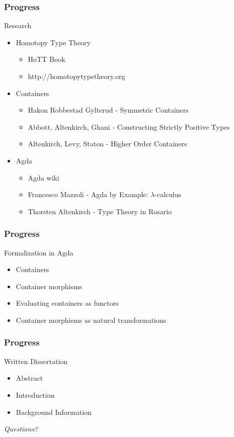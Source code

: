 \documentclass{beamer}
\begin{document}
\begin{frame}
\frametitle{Progress}
\begin{block}{Research}
\begin{itemize}
\item Homotopy Type Theory
\begin{itemize}
\item HoTT Book
\item http://homotopytypetheory.org
\end{itemize}
\item Containers
\begin{itemize}
\item Hakon Robbestad Gylterud - Symmetric Containers
\item Abbott, Altenkirch, Ghani - Constructing Strictly Positive Types
\item Altenkirch, Levy, Staton - Higher Order Containers
\end{itemize}
\item Agda
\begin{itemize}
\item Agda wiki
\item Francesco Mazzoli - Agda by Example: $\lambda$-calculus
\item Thorsten Altenkirch - Type Theory in Rosario
\end{itemize}
\end{itemize}
\end{block}
\end{frame}

\begin{frame}
\frametitle{Progress}

\begin{block}{Formalization in Agda}
\begin{itemize}
\item Containers
\item Container morphisms
\item Evaluating containers as functors
\item Container morphisms as natural transformations
\end{itemize}
\end{block}
\end{frame}

\begin{frame}
\frametitle{Progress}
\begin{block}{Written Dissertation}
\begin{itemize}
\item Abstract
\item Introduction
\item Background Information
\end{itemize}
\end{block}

\end{frame}

\begin{frame}
\Huge{\centerline{\textit{Questions?}}}
\end{frame}

\end{document}
